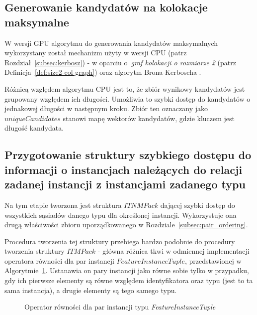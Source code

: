 \documentclass[12pt]{article}
\begin{document}
\subsection{Generowanie kandydatów na kolokacje maksymalne}

W wersji GPU algorytmu do generowania kandydatów maksymalnych wykorzystany został mechanizm użyty w wersji CPU (patrz Rozdział~\ref{subsec:kerbosz}) -  w oparciu o~\textit{graf kolokacji o rozmiarze 2} (patrz Definicja~\ref{def:size2-col-graph}) oraz algorytm Brona-Kerboscha \cite{kerbosz}.

Różnicą względem algorytmu CPU jest to, że zbiór wynikowy kandydatów jest grupowany względem ich długości. Umożliwia to szybki dostęp do kandydatów o jednakowej długości w następnym kroku. Zbiór ten oznaczany jako $ uniqueCandidates $ stanowi mapę wektorów kandydatów, gdzie kluczem jest długość kandydata.

\subsection{Przygotowanie struktury szybkiego dostępu do informacji o instancjach należących do relacji zadanej instancji z instancjami zadanego typu}

Na tym etapie tworzona jest struktura $ ITNMPack $ dającej szybki dostęp do wszystkich sąsiadów danego typu dla określonej instancji. Wykorzystuje ona drugą właściwości zbioru uporządkowanego w Rozdziale~\ref{subsec:pair_ordering}.

Procedura tworzenia tej struktury przebiega bardzo podobnie do procedury tworzenia struktury $ ITMPack $ - główna różnica tkwi w odmiennej implementacji operatora równości dla par instancji $ FeatureInstanceTuple $, przedstawionej w Algorytmie~\ref{alg:FeatureInstanceTuple_operatorITNMPack}. Ustanawia on pary instancji jako równe sobie tylko w przypadku, gdy ich pierwsze elementy są równe względem identyfikatora oraz typu (jest to ta sama instancja), a drugie elementy są tego samego typu.

\begin{figure}[H]
\begin{algorithm}[H]
\caption{Operator równości dla par instancji typu \textit{FeatureInstanceTuple}}
\label{alg:FeatureInstanceTuple_operatorITNMPack}
\end{algorithm}
\end{figure}
\end{document}
